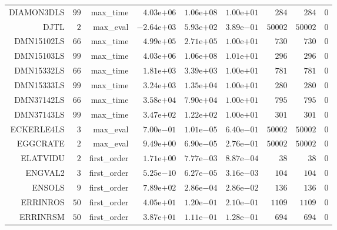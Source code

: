 \begin{longtable}{rrrrrrrrr}
DIAMON3DLS & \(    99\) & max\_time & \( 4.03\)e\(+06\) & \( 1.06\)e\(+08\) & \( 1.00\)e\(+01\) & \(   284\) & \(   284\) & \(     0\) \\
DJTL & \(     2\) & max\_eval & \(-2.64\)e\(+03\) & \( 5.93\)e\(+02\) & \( 3.89\)e\(-01\) & \( 50002\) & \( 50002\) & \(     0\) \\
DMN15102LS & \(    66\) & max\_time & \( 4.99\)e\(+05\) & \( 2.71\)e\(+05\) & \( 1.00\)e\(+01\) & \(   730\) & \(   730\) & \(     0\) \\
DMN15103LS & \(    99\) & max\_time & \( 4.03\)e\(+06\) & \( 1.06\)e\(+08\) & \( 1.01\)e\(+01\) & \(   296\) & \(   296\) & \(     0\) \\
DMN15332LS & \(    66\) & max\_time & \( 1.81\)e\(+03\) & \( 3.39\)e\(+03\) & \( 1.00\)e\(+01\) & \(   781\) & \(   781\) & \(     0\) \\
DMN15333LS & \(    99\) & max\_time & \( 3.24\)e\(+03\) & \( 1.35\)e\(+04\) & \( 1.00\)e\(+01\) & \(   280\) & \(   280\) & \(     0\) \\
DMN37142LS & \(    66\) & max\_time & \( 3.58\)e\(+04\) & \( 7.90\)e\(+04\) & \( 1.00\)e\(+01\) & \(   795\) & \(   795\) & \(     0\) \\
DMN37143LS & \(    99\) & max\_time & \( 3.47\)e\(+02\) & \( 1.22\)e\(+02\) & \( 1.00\)e\(+01\) & \(   301\) & \(   301\) & \(     0\) \\
ECKERLE4LS & \(     3\) & max\_eval & \( 7.00\)e\(-01\) & \( 1.01\)e\(-05\) & \( 6.40\)e\(-01\) & \( 50002\) & \( 50002\) & \(     0\) \\
EGGCRATE & \(     2\) & max\_eval & \( 9.49\)e\(+00\) & \( 6.90\)e\(-05\) & \( 2.76\)e\(-01\) & \( 50002\) & \( 50002\) & \(     0\) \\
ELATVIDU & \(     2\) & first\_order & \( 1.71\)e\(+00\) & \( 7.77\)e\(-03\) & \( 8.87\)e\(-04\) & \(    38\) & \(    38\) & \(     0\) \\
ENGVAL2 & \(     3\) & first\_order & \( 5.25\)e\(-10\) & \( 6.27\)e\(-05\) & \( 3.16\)e\(-03\) & \(   104\) & \(   104\) & \(     0\) \\
ENSOLS & \(     9\) & first\_order & \( 7.89\)e\(+02\) & \( 2.86\)e\(-04\) & \( 2.86\)e\(-02\) & \(   136\) & \(   136\) & \(     0\) \\
ERRINROS & \(    50\) & first\_order & \( 4.05\)e\(+01\) & \( 1.20\)e\(-01\) & \( 2.10\)e\(-01\) & \(  1109\) & \(  1109\) & \(     0\) \\
ERRINRSM & \(    50\) & first\_order & \( 3.87\)e\(+01\) & \( 1.11\)e\(-01\) & \( 1.28\)e\(-01\) & \(   694\) & \(   694\) & \(     0\) \\

\end{longtable}
